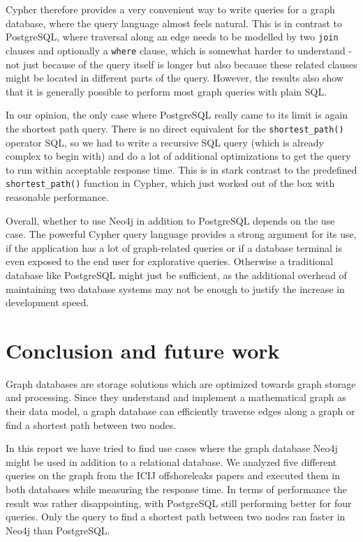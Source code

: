\documentclass[11pt, a4paper,oneside,chapterprefix=false]{scrbook}
\begin{document}
Cypher therefore provides a very convenient way to write queries for a graph database, where the query language almost feels natural.
This is in contrast to PostgreSQL, where traversal along an edge needs to be modelled by two \lstinline{join} clauses and optionally a \lstinline{where} clause, which is somewhat harder to understand - not just because of the query itself is longer but also because these related clauses might be located in different parts of the query.
However, the results also show that it is generally possible to perform most graph queries with plain SQL.

In our opinion, the only case where PostgreSQL really came to its limit is again the shortest path query.
There is no direct equivalent for the \lstinline{shortest_path()} operator SQL, so we had to write a recursive SQL query (which is already complex to begin with) and do a lot of additional optimizations to get the query to run within acceptable response time.
This is in stark contrast to the predefined \lstinline{shortest_path()} function in Cypher, which just worked out of the box with reasonable performance.

Overall, whether to use Neo4j in addition to PostgreSQL depends on the use case.
The powerful Cypher query language provides a strong argument for its use, if the application has a lot of graph-related  queries or if a database terminal is even exposed to the end user for explorative queries.
Otherwise a traditional database like PostgreSQL might just be sufficient, as the additional overhead of maintaining two database systems may not be enough to justify the increase in development speed.


\chapter{Conclusion and future work} \label{chp:conclusion}

Graph databases are storage solutions which are optimized towards graph storage and processing.
Since they understand and implement a mathematical graph as their data model, a graph database can efficiently traverse edges along a graph or find a shortest path between two nodes.

In this report we have tried to find use cases where the graph database Neo4j might be used in addition to a relational database.
We analyzed five different queries on the graph from the ICIJ offshoreleaks papers and executed them in both databases while measuring the response time.
In terms of performance the result was rather disappointing, with PostgreSQL still performing better for four queries.
Only the query to find a shortest path between two nodes ran faster in Neo4j than PostgreSQL.
\end{document}
